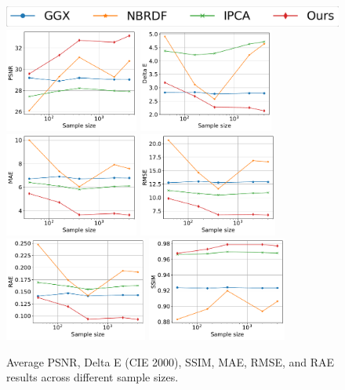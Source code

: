 \begin{figure}[t]
  \centering
    {\includegraphics[width=0.35\linewidth]{Chapters/hyperbrdf-figs/legend.png}}\\
  {\includegraphics[width=0.32\linewidth, height=3.4cm]{Chapters/hyperbrdf-figs/PSNR_ggx.pdf}}
  {\includegraphics[width=0.32\linewidth, height=3.4cm]{Chapters/hyperbrdf-figs/DeltaE_ggx.pdf}}
  {\includegraphics[width=0.32\linewidth, height=3.4cm]{Chapters/hyperbrdf-figs/MAE_ggx.pdf}}
  {\includegraphics[width=0.32\linewidth, height=3.4cm]{Chapters/hyperbrdf-figs/RMSE_ggx.pdf}}
    {\includegraphics[width=0.32\linewidth, height=3.4cm]{Chapters/hyperbrdf-figs/RAE_ggx.pdf}}
    {\includegraphics[width=0.32\linewidth, height=3.4cm]{Chapters/hyperbrdf-figs/SSIM_ggx.pdf}}
   \caption{Average PSNR, Delta E (CIE 2000), SSIM, MAE, RMSE, and RAE results across different sample sizes. }
   \label{fig:imp_plots}
\end{figure}



